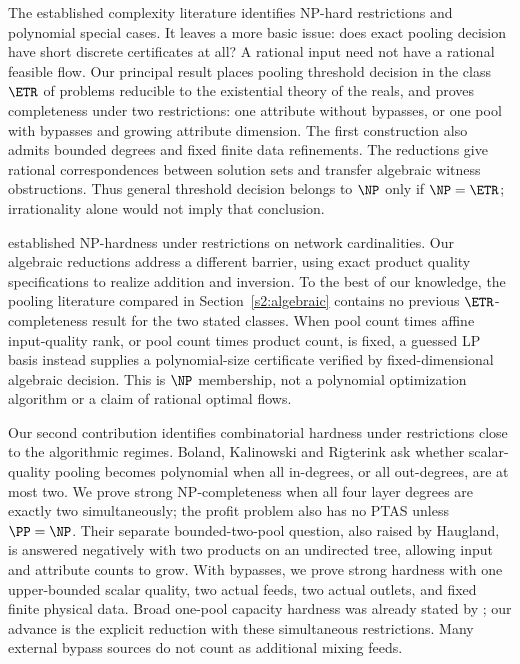 The established complexity literature identifies NP-hard restrictions
and polynomial special cases. It leaves a more basic issue: does exact
pooling decision have short discrete certificates at all? A rational
input need not have a rational feasible flow. Our principal result places
pooling threshold decision in the class $\ETR$ of problems reducible to
the existential theory of the reals, and proves completeness under two
restrictions: one attribute without bypasses, or one pool with bypasses
and growing attribute dimension. The first construction also admits
bounded degrees and fixed finite data refinements. The reductions give
rational correspondences between solution sets and transfer algebraic
witness obstructions. Thus general threshold decision belongs to $\NP$
only if $\NP=\ETR$; irrationality alone would not imply that conclusion.

\citet{haugland2016-the-computational-complexity-of-the} established
NP-hardness under restrictions on network cardinalities. Our algebraic
reductions address a different barrier, using exact product quality
specifications to realize addition and inversion. To the best of our
knowledge, the pooling literature compared in Section~\ref{s2:algebraic}
contains no previous $\ETR$-completeness result for the two stated
classes. When pool count times affine input-quality rank, or pool count
times product count, is fixed, a guessed LP basis instead supplies a
polynomial-size certificate verified by fixed-dimensional algebraic
decision. This is $\NP$ membership, not a polynomial optimization
algorithm or a claim of rational optimal flows.

Our second contribution identifies combinatorial hardness under
restrictions close to the algorithmic regimes. Boland, Kalinowski and
Rigterink \cite[author manuscript, Section~4]{s4:boland2017} ask whether
scalar-quality pooling becomes polynomial when all in-degrees, or all
out-degrees, are at most two. We prove strong NP-completeness when all
four layer degrees are exactly two simultaneously; the profit problem
also has no PTAS unless $\PP=\NP$. Their separate bounded-two-pool
question, also raised by Haugland, is answered negatively with two
products on an undirected tree, allowing input and attribute counts to
grow. With bypasses, we prove strong hardness with one upper-bounded
scalar quality, two actual feeds, two actual outlets, and fixed finite
physical data. Broad one-pool capacity hardness was already stated by
\citet[Remark~4.6]{s3:baltean2018}; our advance is the explicit reduction
with these simultaneous restrictions. Many external bypass sources do
not count as additional mixing feeds.

